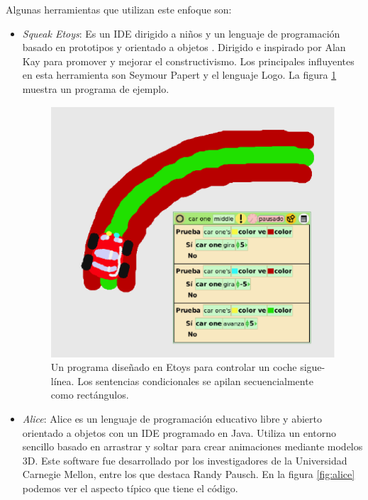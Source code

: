 \documentclass{llncs}
\begin{document}
Algunas herramientas que utilizan este enfoque son:
\begin{itemize}
\item {\em Squeak Etoys}: Es un IDE dirigido a niños y un lenguaje de programación basado en prototipos y orientado a objetos \cite{etoysOnline}. Dirigido e inspirado por Alan Kay para promover y mejorar el constructivismo. Los principales influyentes en esta herramienta son Seymour Papert y el lenguaje Logo. La figura \ref{fig:etoys} muestra un programa de ejemplo.


\begin{figure}[ht]
\begin{center}
\includegraphics[scale=0.4]{images/etoys.eps}
\caption{Un programa diseñado en Etoys para controlar un coche sigue-línea. Los sentencias condicionales se apilan secuencialmente como rectángulos.
\label{fig:etoys}}
\end{center}
\end{figure}

\item {\em Alice}: Alice \cite{AliceOnline} es un lenguaje de programación educativo libre y abierto orientado a objetos con un IDE programado en Java. Utiliza un entorno sencillo basado en arrastrar y soltar para crear animaciones mediante modelos 3D. Este software fue desarrollado por los investigadores de la Universidad Carnegie Mellon, entre los que destaca Randy Pausch. En la figura \ref{fig:alice} podemos ver el aspecto típico que tiene el código.


\end{itemize}
\end{document}
